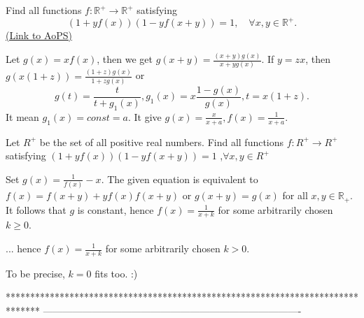 \begin{problem}
	Find all functions $f: \mathbb R^{+} \to \mathbb R^{+}$ satisfying 
\[ (1+yf(x))(1-yf(x+y))=1, \quad \forall x,y \in \mathbb R^+.\]
	\flushright \href{https://artofproblemsolving.com/community/c6h310386}{(Link to AoPS)}
\end{problem}



\begin{solution}
	Let $ g(x)=xf(x)$, then we get $ g(x+y)=\frac{(x+y)g(x)}{x+yg(x)}$.
If $ y=zx$, then $ g(x(1+z))=\frac{(1+z)g(x)}{1+zg(x)}$ or \[ g(t)=\frac{t}{t+g_1(x)}, g_1(x)=x\frac{1-g(x)}{g(x)},t=x(1+z).\]
It mean $ g_1(x)=const=a$. It give $ g(x)=\frac{x}{x+a},f(x)=\frac{1}{x+a}.$
\end{solution}



\begin{solution}
	\begin{tcolorbox}Let $ R^ +$ be the set of all positive real numbers. Find all functions $ f: R^ + \to R^ +$ satisfying 
$ (1 + yf(x))(1 - yf(x + y)) = 1$ ,$ \forall x,y \in R^ +$\end{tcolorbox}

Set $ g(x) = \frac {1}{f(x)} - x$. The given equation is equivalent to $ f(x) = f(x + y) + yf(x)f(x + y)$ or $ g(x + y) = g(x)$ for all $ x,y \in \mathbb{R_ + }$. It follows that $ g$ is constant, hence $ f(x) = \frac {1}{x + k}$ for some arbitrarily chosen $ k \ge 0$.
\end{solution}



\begin{solution}
	\begin{tcolorbox} ... hence $ f(x) = \frac {1}{x + k}$ for some arbitrarily chosen $ k > 0$.\end{tcolorbox}

To be precise, $ k=0$ fits too.  :)
\end{solution}



*******************************************************************************
-------------------------------------------------------------------------------

